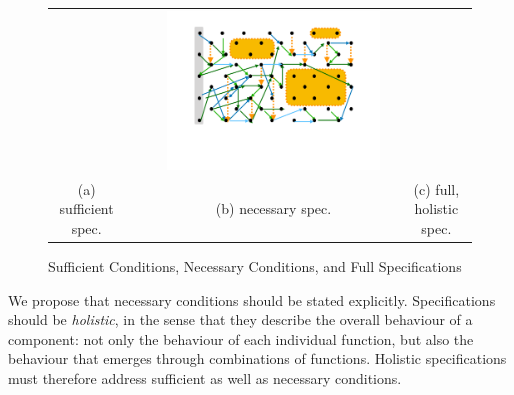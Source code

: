 \begin{figure}[htb]
\begin{tabular}{clclc}
\begin{minipage}{0.29\textwidth}
\end{minipage}
 & \ \ \ &
\begin{minipage}{0.29\textwidth}
 \includegraphics[width=\linewidth, trim=100  120 130 60,clip]{diagrams/neccSuffYellowAllExtended.pdf}
 \end{minipage}
\\
(a) sufficient  spec.& & (b) necessary spec. & & (c) full, holistic spec.
 \end{tabular}
  \vspace*{-2.5mm}
  \caption{Sufficient Conditions, Necessary Conditions, and Full Specifications}
 \label{fig:NecessaryAndSuff}
 \end{figure}
 
 We propose that  necessary conditions should be stated
 explicitly. Specifications should be \emph{holistic}, in the sense
 that they describe the  overall behaviour of a component: not only the
 behaviour of each individual function, but also  the
 behaviour that emerges through combinations of functions.
%
Holistic specifications must therefore address sufficient as well as necessary conditions.

